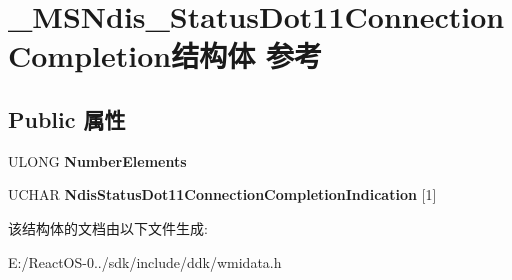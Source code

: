 \hypertarget{struct___m_s_ndis___status_dot11_connection_completion}{}\section{\+\_\+\+M\+S\+Ndis\+\_\+\+Status\+Dot11\+Connection\+Completion结构体 参考}
\label{struct___m_s_ndis___status_dot11_connection_completion}
\subsection*{Public 属性}
\begin{DoxyCompactItemize}
\item 
\mbox{\label{struct___m_s_ndis___status_dot11_connection_completion_a4354bbc19b2d8ec4a720fe13656fd4d1}} 
U\+L\+O\+NG {\bfseries Number\+Elements}
\item 
\mbox{\label{struct___m_s_ndis___status_dot11_connection_completion_ab3e2b3b7ff71c21fb30a344859a63f2e}} 
U\+C\+H\+AR {\bfseries Ndis\+Status\+Dot11\+Connection\+Completion\+Indication} \mbox{[}1\mbox{]}
\end{DoxyCompactItemize}


该结构体的文档由以下文件生成\+:\begin{DoxyCompactItemize}
\item 
E\+:/\+React\+O\+S-\/0../sdk/include/ddk/wmidata.\+h\end{DoxyCompactItemize}
